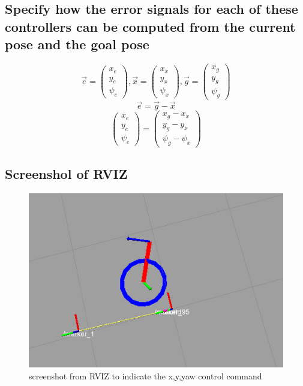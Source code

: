 \documentclass[14pt,a4paper]{article}
\begin{document}
	\subsection{Specify how the error signals for each of these controllers can be computed from the current pose and the goal pose}
				\[\vec{e}= \left( \begin{array}{c}
						x_{e} \\ y_{e}\\ \psi_e 
				\end{array}\right) , \vec{x}= \left( \begin{array}{c}
						x_{x} \\ y_{x}\\ \psi_x 
				\end{array}\right), \vec{g}= \left( \begin{array}{c}
						x_{g} \\ y_{g}\\ \psi_g 
				\end{array}\right)\] 	
		$$
				\vec{e} = \vec{g} - \vec{x}
		$$
				\[\left( \begin{array}{c}
						x_{e} \\ y_{e}\\ \psi_e 
				\end{array}\right)= \left( \begin{array}{c}
						x_{g} - x_{x} \\ y_{g}- y_{x} \\ \psi_g - \psi_x 
				\end{array}\right)\] 
				
	\subsection{Screenshol of RVIZ}
	\begin{figure}[htbp]
	\centering
	\includegraphics[scale=0.7]{control_flight.png}
  	\caption{screenshot from RVIZ to indicate the x,y,yaw control command}
    \label{graph:RVIZ control}
	\end{figure}
	
\end{document}
